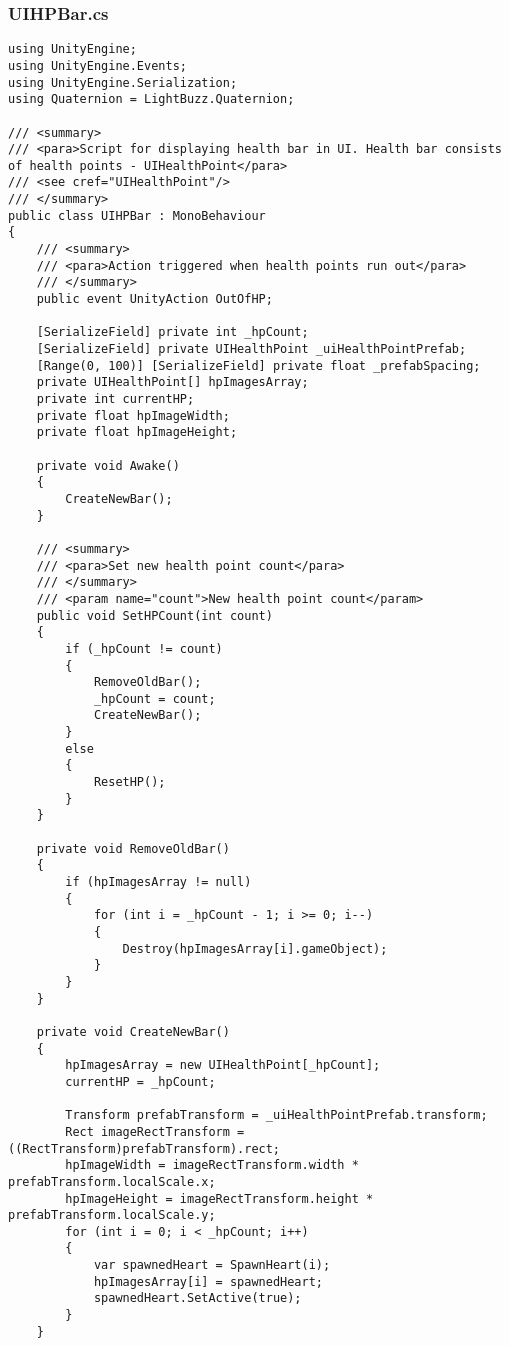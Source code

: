 \subsubsection*{UIHPBar.cs}
\begin{verbatim}
using UnityEngine;
using UnityEngine.Events;
using UnityEngine.Serialization;
using Quaternion = LightBuzz.Quaternion;

/// <summary>
/// <para>Script for displaying health bar in UI. Health bar consists of health points - UIHealthPoint</para>
/// <see cref="UIHealthPoint"/>
/// </summary>
public class UIHPBar : MonoBehaviour
{
    /// <summary>
    /// <para>Action triggered when health points run out</para>
    /// </summary>
    public event UnityAction OutOfHP;

    [SerializeField] private int _hpCount;
    [SerializeField] private UIHealthPoint _uiHealthPointPrefab;
    [Range(0, 100)] [SerializeField] private float _prefabSpacing;
    private UIHealthPoint[] hpImagesArray;
    private int currentHP;
    private float hpImageWidth;
    private float hpImageHeight;

    private void Awake()
    {
        CreateNewBar();
    }

    /// <summary>
    /// <para>Set new health point count</para>
    /// </summary>
    /// <param name="count">New health point count</param>
    public void SetHPCount(int count)
    {
        if (_hpCount != count)
        {
            RemoveOldBar();
            _hpCount = count;
            CreateNewBar();
        }
        else
        {
            ResetHP();
        }
    }

    private void RemoveOldBar()
    {
        if (hpImagesArray != null)
        {
            for (int i = _hpCount - 1; i >= 0; i--)
            {
                Destroy(hpImagesArray[i].gameObject);
            }
        }
    }

    private void CreateNewBar()
    {
        hpImagesArray = new UIHealthPoint[_hpCount];
        currentHP = _hpCount;

        Transform prefabTransform = _uiHealthPointPrefab.transform;
        Rect imageRectTransform = ((RectTransform)prefabTransform).rect;
        hpImageWidth = imageRectTransform.width * prefabTransform.localScale.x;
        hpImageHeight = imageRectTransform.height * prefabTransform.localScale.y;
        for (int i = 0; i < _hpCount; i++)
        {
            var spawnedHeart = SpawnHeart(i);
            hpImagesArray[i] = spawnedHeart;
            spawnedHeart.SetActive(true);
        }
    }


\end{verbatim}
